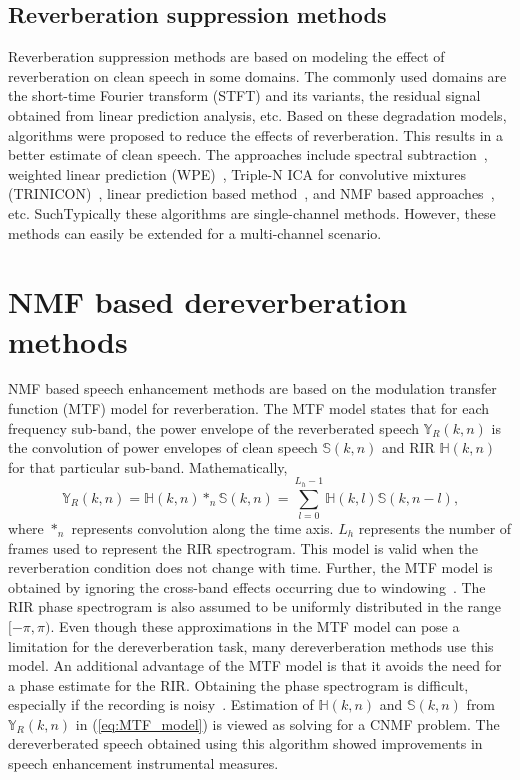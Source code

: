 \subsection{Reverberation suppression methods}
Reverberation suppression methods are based on modeling the effect of reverberation on clean speech in some domains. The commonly used domains are the short-time Fourier transform (STFT) and its variants, the residual signal obtained from linear prediction analysis, etc. Based on these degradation models, algorithms were proposed to reduce the effects of reverberation. This results in a better estimate of clean speech. The approaches include spectral subtraction~\cite{lebart2001new}, weighted linear prediction (WPE)~\cite{nakatani2010speech}, Triple-N ICA for convolutive mixtures (TRINICON)~\cite{buchner2007trinicon}, linear prediction based method~\cite{naylor2010speech}, and NMF based approaches~\cite{kameoka2009robust}, etc. SuchTypically these algorithms are single-channel methods. However, these methods can easily be extended for a multi-channel scenario.

\section{NMF based dereverberation methods}
\label{sec:NMF_methods}

NMF based speech enhancement methods are based on the modulation transfer function (MTF) model for reverberation. The MTF model states that for each frequency sub-band, the power envelope of the reverberated speech $\mathbb{Y}_R(k,n)$ is the convolution of power envelopes of clean speech $\mathbb{S}(k,n)$ and RIR $\mathbb{H}(k,n)$ for that particular sub-band. Mathematically,
\begin{equation}
\mathbb{Y}_R(k,n)=\mathbb{H}(k,n)*_n\mathbb{S}(k,n)=\sum_{l=0}^{L_h-1}\mathbb{H}(k,l)\mathbb{S}(k,n-l)\text{,}
\label{eq:MTF_model}
\end{equation}
where $*_n$ represents convolution along the time axis. $L_h$ represents the number of frames used to represent the RIR spectrogram. This model is valid when the reverberation condition does not change with time. Further, the MTF model is obtained by ignoring the cross-band effects occurring due to windowing~\cite{avargel2007system}.  The RIR phase spectrogram is also assumed to be uniformly distributed in the range $[-\pi, \pi)$.
Even though these approximations in the MTF model can pose a limitation for the dereverberation task, many dereverberation methods use this model. An additional advantage of the MTF model is that it avoids the need for a phase estimate for the RIR. Obtaining the phase spectrogram is difficult, especially if the recording is noisy~\cite{kameoka2009robust}. Estimation of $\mathbb{H}(k,n)$ and $\mathbb{S}(k,n)$ from $\mathbb{Y}_R(k,n)$ in (\ref{eq:MTF_model}) is viewed as solving for a CNMF problem. The dereverberated speech obtained using this algorithm showed improvements in speech enhancement instrumental measures.

